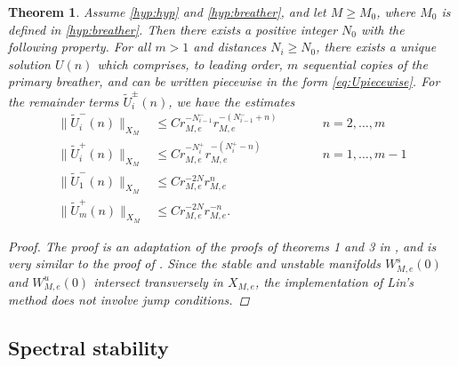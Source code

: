 \documentclass[12pt,reqno]{amsart}
\newtheorem{theorem}{Theorem}
\begin{document}
\begin{theorem}\label{th:multikinks}
Assume \cref{hyp:hyp} and \cref{hyp:breather}, and let $M \geq M_0$, where $M_0$ is defined in \cref{hyp:breather}. Then there exists a positive integer $N_0$ with the following property. For all $m > 1$ and distances $N_i \geq N_0$, there exists a unique solution $U(n)$ which comprises, to leading order, $m$ sequential copies of the primary breather, and can be written piecewise in the form \cref{eq:Upiecewise}. For the remainder terms $\tilde{U}_i^\pm(n)$, we have the estimates
\begin{equation}\label{eq:Uestimates}
\begin{aligned}
\| \tilde{U}_i^-(n)\|_{X_M} &\leq C r_{M,e}^{-N_{i-1}^-} r_{M,e}^{-(N_{i-1}^- + n)} && \qquad n = 2, \dots, m\\
\|\tilde{U}_i^+(n) \|_{X_M} &\leq C r_{M,e}^{-N_i^+} r_{M,e}^{-(N_i^+ - n)} && \qquad n = 1, \dots, m-1 \\
\| \tilde{U}_1^-(n)\|_{X_M} &\leq C r_{M,e}^{-2N} r_{M,e}^{n} \\
\|\tilde{U}_m^+(n) \|_{X_M} &\leq C r_{M,e}^{-2N} r_{M,e}^{-n} .
\end{aligned}
\end{equation}
\begin{proof}
The proof is an adaptation of the proofs of theorems 1 and 3 in \cite{Parker2020}, and is very similar to the proof of \cite[Theorem 1]{Parker2021}. Since the stable and unstable manifolds $W_{M,e}^s(0)$ and $W_{M,e}^u(0)$ intersect transversely in $X_{M,e}$, the implementation of Lin's method does not involve jump conditions.
\end{proof}
\end{theorem}



\subsection{Spectral stability}


\end{document}
